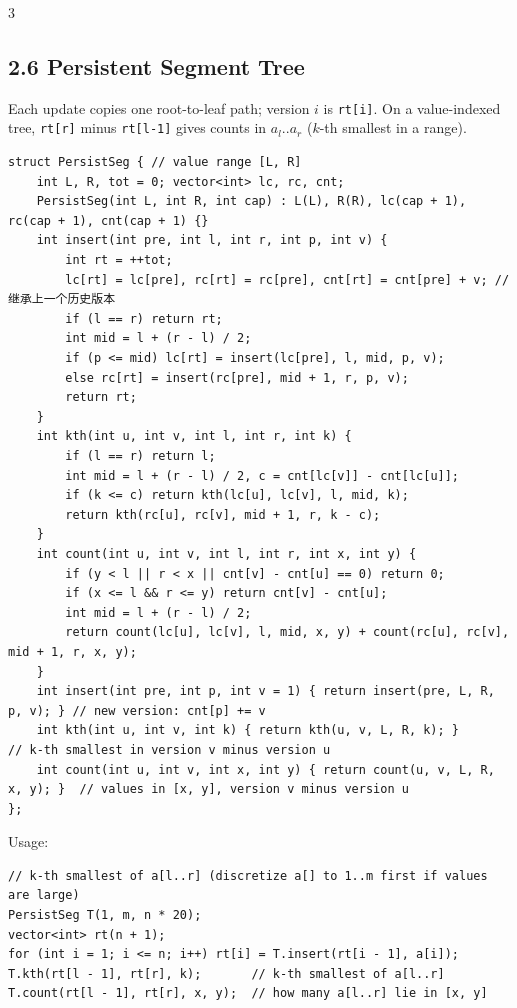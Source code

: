 \documentclass[8pt]{extarticle}
\begin{document}
\begin{multicols*}{3}
\subsection*{2.6 Persistent Segment Tree}

Each update copies one root-to-leaf path; version $i$ is \texttt{rt[i]}. On a value-indexed tree, \texttt{rt[r]} minus \texttt{rt[l-1]} gives counts in $a_l..a_r$ ($k$-th smallest in a range).

\begin{lstlisting}
struct PersistSeg { // value range [L, R]
    int L, R, tot = 0; vector<int> lc, rc, cnt;
    PersistSeg(int L, int R, int cap) : L(L), R(R), lc(cap + 1), rc(cap + 1), cnt(cap + 1) {}
    int insert(int pre, int l, int r, int p, int v) {
        int rt = ++tot;
        lc[rt] = lc[pre], rc[rt] = rc[pre], cnt[rt] = cnt[pre] + v; //继承上一个历史版本
        if (l == r) return rt;
        int mid = l + (r - l) / 2;
        if (p <= mid) lc[rt] = insert(lc[pre], l, mid, p, v);
        else rc[rt] = insert(rc[pre], mid + 1, r, p, v);
        return rt;
    }
    int kth(int u, int v, int l, int r, int k) {
        if (l == r) return l;
        int mid = l + (r - l) / 2, c = cnt[lc[v]] - cnt[lc[u]];
        if (k <= c) return kth(lc[u], lc[v], l, mid, k);
        return kth(rc[u], rc[v], mid + 1, r, k - c);
    }
    int count(int u, int v, int l, int r, int x, int y) {
        if (y < l || r < x || cnt[v] - cnt[u] == 0) return 0;
        if (x <= l && r <= y) return cnt[v] - cnt[u];
        int mid = l + (r - l) / 2;
        return count(lc[u], lc[v], l, mid, x, y) + count(rc[u], rc[v], mid + 1, r, x, y);
    }
    int insert(int pre, int p, int v = 1) { return insert(pre, L, R, p, v); } // new version: cnt[p] += v
    int kth(int u, int v, int k) { return kth(u, v, L, R, k); }               // k-th smallest in version v minus version u
    int count(int u, int v, int x, int y) { return count(u, v, L, R, x, y); }  // values in [x, y], version v minus version u
};
\end{lstlisting}

Usage:

\begin{lstlisting}
// k-th smallest of a[l..r] (discretize a[] to 1..m first if values are large)
PersistSeg T(1, m, n * 20);
vector<int> rt(n + 1);
for (int i = 1; i <= n; i++) rt[i] = T.insert(rt[i - 1], a[i]);
T.kth(rt[l - 1], rt[r], k);       // k-th smallest of a[l..r]
T.count(rt[l - 1], rt[r], x, y);  // how many a[l..r] lie in [x, y]
\end{lstlisting}


\end{multicols*}
\end{document}
